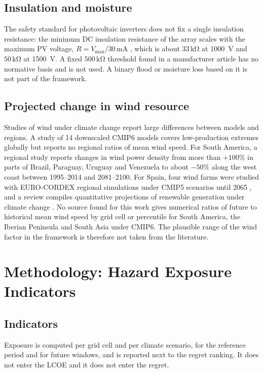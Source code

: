 \subsection{Insulation and moisture}
The safety standard for photovoltaic inverters does not fix a single insulation resistance: the minimum DC insulation resistance of the array scales with the maximum PV voltage, $R = V_{\max} / 30\,\mathrm{mA}$ \citep{iec62109}, which is about $33\,\mathrm{k\Omega}$ at 1000~V and $50\,\mathrm{k\Omega}$ at 1500~V. %
A fixed $500\,\mathrm{k\Omega}$ threshold found in a manufacturer article has no normative basis and is not used. A binary flood or moisture loss based on it is not part of the framework.

\subsection{Projected change in wind resource}
Studies of wind under climate change report large differences between models and regions. A study of 14 downscaled CMIP6 models covers low-production extremes globally but reports no regional ratios of mean wind speed. %
For South America, a regional study reports changes in wind power density from more than $+100\%$ in parts of Brazil, Paraguay, Uruguay and Venezuela to about $-50\%$ along the west coast between 1995--2014 and 2081--2100. \citep{martinez2024} %
For Spain, four wind farms were studied with EURO-CORDEX regional simulations under CMIP5 scenarios until 2065 \citep{solaun2020}, and a review compiles quantitative projections of renewable generation under climate change \citep{solaun2019}. No source found for this work gives numerical ratios of future to historical mean wind speed by grid cell or percentile for South America, the Iberian Peninsula and South Asia under CMIP6. The plausible range of the wind factor in the framework is therefore not taken from the literature.

\section{Methodology: Hazard Exposure Indicators}
\label{sec:g5-method}

\subsection{Indicators}
Exposure is computed per grid cell and per climate scenario, for the reference period and for future windows, and is reported next to the regret ranking. It does not enter the LCOE and it does not enter the regret.

